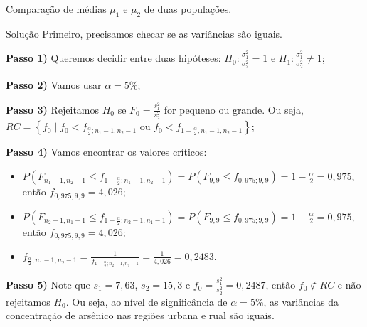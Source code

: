 \documentclass[9pt]{beamer}
\begin{document}
\begin{frame}{Comparação de médias $\mu_1$ e $\mu_2$ de duas populações.}
\small
\begin{block}{Solução}
	Primeiro, precisamos checar se as variâncias são iguais. 
	
	\textbf{Passo 1)} Queremos decidir entre duas hipóteses: $H_0: \frac{\sigma_1^2}{\sigma_2^2} = 1$ e $H_1: \frac{\sigma_1^2}{\sigma_2^2} \neq 1$;
	
	\textbf{Passo 2)} Vamos usar $\alpha=5\%$;
	
	\textbf{Passo 3)} Rejeitamos $H_0$ se $F_0 = \frac{s_1^2}{s_2^2}$ for pequeno ou grande. Ou seja, $RC = \left\{ f_0 \mid f_0 < f_{\frac{\alpha}{2}; n_1-1, n_2-1} \mbox{ ou } f_0 < f_{1-\frac{\alpha}{2}, n_1-1, n_2-1} \right\}$;
	
	\textbf{Passo 4)} Vamos encontrar os valores críticos:
	\begin{itemize}
		\item $P(F_{n_1-1, n_2-1} \leq f_{1-\frac{\alpha}{2}; n_1-1, n_2-1}) = P(F_{9, 9} \leq f_{0,975; 9, 9}) = 1-\frac{\alpha}{2} = 0,975$, então $f_{0,975; 9, 9}=4,026$;
		\item $P(F_{n_2-1, n_1-1} \leq f_{1-\frac{\alpha}{2}; n_2-1, n_1-1}) = P(F_{9, 9} \leq f_{0,975; 9, 9}) = 1-\frac{\alpha}{2} = 0,975$, então $f_{0,975; 9, 9}=4,026$;
		\item $f_{\frac{\alpha}{2}; n_1-1, n_2-1} = \frac{1}{f_{1-\frac{\alpha}{2}; n_2-1, n_1-1}}=\frac{1}{4,026}=0,2483$.
	\end{itemize}

	\textbf{Passo 5)} Note que $s_1 = 7,63$, $s_2=15,3$ e $f_0= \frac{s_1^2}{s_2^2} = 0,2487$, então $f_0 \not\in RC$ e não rejeitamos $H_0$. Ou seja, ao nível de significância de $\alpha=5\%$, as variâncias da concentração de arsênico nas regiões urbana e rual são iguais.
	
\end{block}
\normalsize
\end{frame}
\end{document}
